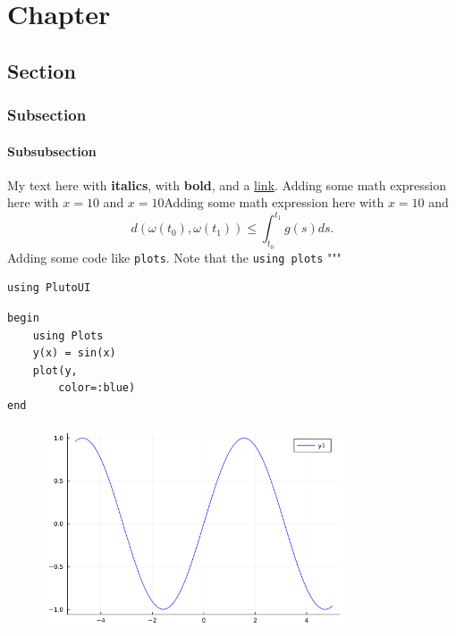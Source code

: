\newpage
\chapter{Chapter}
\section{Section}
\subsection{Subsection}
\subsubsection{Subsubsection}
My text here with \textbf{italics}, with \textbf{bold}, and a \href{https://davibarreira.github.io/}{link}.  Adding some math expression here with $x=10$ and $x=10$Adding some math expression here with $x=10$ and \begin{displaymath}
	d(\omega(t_0),\omega(t_1)) \leq \int^{t_1}_{t_0}g(s) ds.
\end{displaymath} Adding some code like  \lstinline{plots}. Note that the  \lstinline{using plots} """
\begin{lstlisting}[language=JuliaLocal, style=julia]
using PlutoUI
\end{lstlisting}

\begin{lstlisting}[language=JuliaLocal, style=julia]
begin
	using Plots
	y(x) = sin(x)
	plot(y,
		color=:blue)
end
\end{lstlisting}

\begin{figure}[H]
	\centering
	\includegraphics[width=0.8\textwidth]{./figures/notebooktest_figure1.png}
	\label{fig:notebooktest_figure1.png}

\end{figure}

